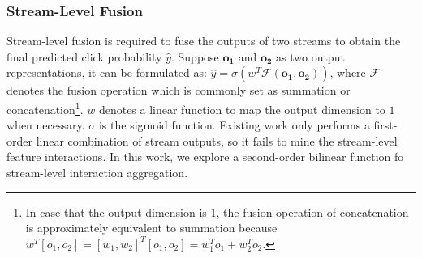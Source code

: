 \documentclass[letterpaper]{article} \usepackage{aaai23}  \usepackage{times}  \usepackage{helvet}  \usepackage{courier}  \usepackage[hyphens]{url}  \usepackage{graphicx} \urlstyle{rm} \def\UrlFont{\rm}  \usepackage{natbib}  \usepackage{caption} \frenchspacing  \setlength{\pdfpagewidth}{8.5in}  \setlength{\pdfpageheight}{11in}  \usepackage{algorithm}
\begin{document}
\subsubsection{\textbf{Stream-Level Fusion}}
Stream-level fusion is required to fuse the outputs of two streams to obtain the final predicted click probability $\hat{y}$. 
Suppose $\mathbf{o_1}$ and $\mathbf{o_2}$ as two output representations, it can be formulated as:
$\hat{y} = \sigma (w^T\mathcal{F}(\mathbf{o_1}, \mathbf{o_2}))$,
where $\mathcal{F}$ denotes the fusion operation which is commonly set as summation or concatenation\footnote{In case that the output dimension is $1$, the fusion operation of concatenation is approximately equivalent to summation because $w^T[o_1,o_2] = [w_1,w_2]^T[o_1,o_2] = w_1^To_1 + w_2^To_2$.}. $w$ denotes a linear function to map the output dimension to $1$ when necessary. $\sigma$ is the sigmoid function. Existing work only performs a first-order linear combination of stream outputs, so it fails to mine the stream-level feature interactions. In this work, we explore a second-order bilinear function fo stream-level interaction aggregation.
\end{document}
